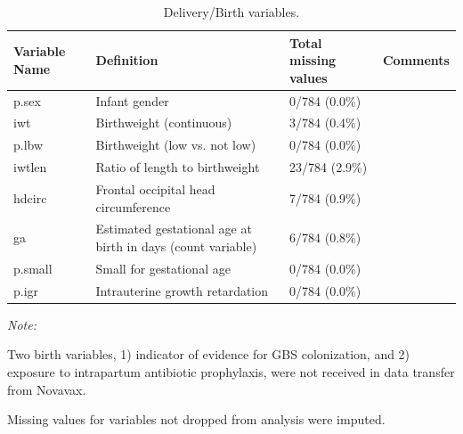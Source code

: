 \documentclass[11pt]{article}
\begin{document}
\begin{table}[!h]

\caption{\label{tab:pedVars}Delivery/Birth variables. \label{tab:pedVarstable}}
\centering
\fontsize{9}{11}\selectfont
\begin{threeparttable}
\begin{tabular}[t]{l>{\raggedright\arraybackslash}p{3cm}l>{\raggedright\arraybackslash}p{3cm}}
\toprule
Variable Name & Definition & Total missing values & Comments\\
\midrule
p.sex & Infant gender & 0/784 (0.0\%) & \\
iwt & Birthweight (continuous) & 3/784 (0.4\%) & \\
p.lbw & Birthweight (low vs. not low) & 0/784 (0.0\%) & \\
iwtlen & Ratio of length to birthweight & 23/784 (2.9\%) & \\
hdcirc & Frontal occipital head circumference & 7/784 (0.9\%) & \\
ga & Estimated gestational age at birth in days (count variable) & 6/784 (0.8\%) & \\
p.small & Small for gestational age & 0/784 (0.0\%) & \\
p.igr & Intrauterine growth retardation & 0/784 (0.0\%) & \\
\bottomrule
\end{tabular}
\begin{tablenotes}
\item \textit{Note: } 
\item Two birth variables, 1) indicator of evidence for GBS colonization, and 2) exposure to intrapartum antibiotic prophylaxis, were not received in data transfer from Novavax.
\item Missing values for variables not dropped from analysis were imputed.
\end{tablenotes}
\end{threeparttable}
\end{table}
\end{document}

